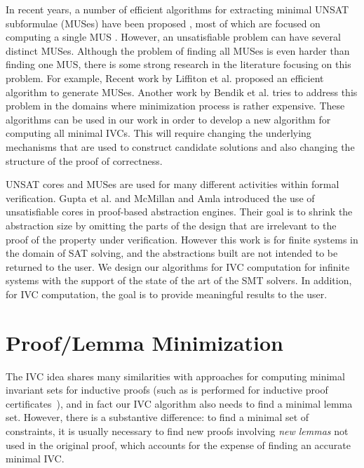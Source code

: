 In  recent  years,  a  number  of  efficient algorithms  for  extracting minimal UNSAT subformulae (MUSes)  have  been proposed \cite{liffiton2005max},
most of which are focused on computing a single MUS  \cite{bacchus2015using, belov2012muser2, belov2013core, belov2012towards, nadel2014accelerated}.
However, an unsatisfiable problem can have several distinct MUSes. Although the problem of finding all MUSes is even harder than finding one MUS, there is some strong research in the literature focusing on this problem. For example, Recent work by Liffiton et al. \cite{marco2016fast} proposed an efficient algorithm to generate MUSes.
Another work by Bendik et al. \cite{bendk16} tries to address this problem in the domains where minimization process is rather expensive.
These algorithms can be used in our work in order to develop a new algorithm for computing all minimal IVCs. This will require changing the underlying mechanisms that are used to construct candidate solutions and also changing the structure of the proof of correctness.

UNSAT cores and MUSes are used for many different activities within
formal verification. Gupta et al. \cite{gupta2003iterative} and
McMillan and Amla \cite{mcmillan2003automatic} introduced the use of
unsatisfiable cores in proof-based abstraction engines. Their goal is
to shrink the abstraction size by omitting the parts of the design
that are irrelevant to the proof of the property under verification.
However this work is for finite systems in the domain of SAT solving,
 and the abstractions built are not intended to be returned to the user.
 We design our algorithms for IVC computation for
 infinite systems with the support of the state of the art of the SMT solvers. In addition, for IVC computation, the goal is to provide meaningful results to the user.

\section{Proof/Lemma Minimization}
The IVC idea shares many similarities with approaches for computing minimal invariant sets for inductive proofs (such as is performed for inductive proof certificates~\cite{piskac2016, Ivrii14:invariants}), and in fact our IVC algorithm also needs to find a minimal lemma set.  However, there is a substantive difference: to find a minimal set of constraints, it is usually necessary to find new proofs involving {\em new lemmas} not used in the original proof, which accounts for the expense of finding an accurate minimal IVC.


